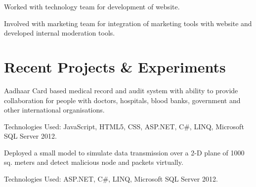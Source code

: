 \documentclass[]{gagan-resume}
\begin{document}
\begin{minipage}[t]{0.66\textwidth}
\begin{tightemize}
\item Worked with technology team for development of website.
\item Involved with marketing team for integration of marketing tools with website and developed internal moderation tools.
\end{tightemize}
\sectionsep



\section{Recent Projects \& Experiments}
\begin{tightemize}
\item Aadhaar Card based medical record and audit system with ability to provide collaboration for people with doctors, hospitals, blood banks, government and other international organisations.
\item Technologies Used: JavaScript, HTML5, CSS, ASP.NET, C\#, LINQ, Microsoft SQL Server 2012.
\end{tightemize}
\sectionsep

\begin{tightemize}
\item Deployed a small model to simulate data transmission over a 2-D plane of 1000 sq. meters and detect malicious node and packets virtually.
\item Technologies Used: ASP.NET, C\#, LINQ, Microsoft SQL Server 2012.
\end{tightemize}
\sectionsep



\end{minipage} 
\hfill
\end{document}
